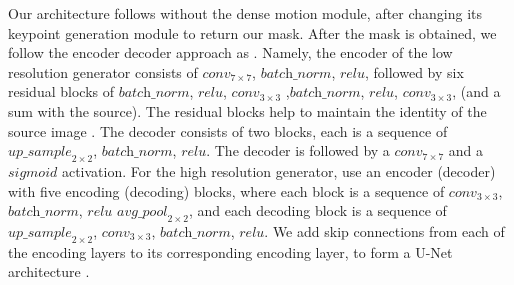 \documentclass{article}
\begin{document}
Our architecture follows \cite{siarohin2020animating} without the dense
motion module, after changing its keypoint generation module to return our
mask. After the mask is obtained, we follow the encoder decoder approach as
\cite{shalev2020image}.
Namely, the encoder of the low resolution generator consists of $\textit{conv}_{7
\times 7}$, $\textit{batch\_norm}$, $\textit{relu}$, followed by six
residual blocks of $\textit{batch\_norm}$, $\textit{relu}$,
$\textit{conv}_{3 \times 3}$ ,$\textit{batch\_norm}$, $\textit{relu}$,
$\textit{conv}_{3 \times 3}$, (and a sum with the source).
The residual blocks help to maintain the identity of the source image
\cite{he2015deep}.
The decoder consists of two blocks, each is a sequence of
$\textit{up\_sample}_{2 \times 2 }$, $\textit{batch\_norm}$,
$\textit{relu}$. The decoder is followed by a $\textit{conv}_{7 \times 7}$
and a $\textit{sigmoid}$ activation.
For the high resolution generator, use an encoder (decoder) with five encoding (decoding) blocks,
where each block is a sequence of
$\textit{conv}_{3 \times 3}$, $\textit{batch\_norm}$, $\textit{relu}$
$\textit{avg\_pool}_{2 \times 2}$, and each decoding block is a sequence of
$\textit{up\_sample}_{2 \times 2}$, $\textit{conv}_{3 \times 3}$,
$\textit{batch\_norm}$, $\textit{relu}$.
We add skip connections from each of the encoding layers to its
corresponding encoding layer, to form a U-Net architecture
\cite{ronneberger2015unet}.
\end{document}

